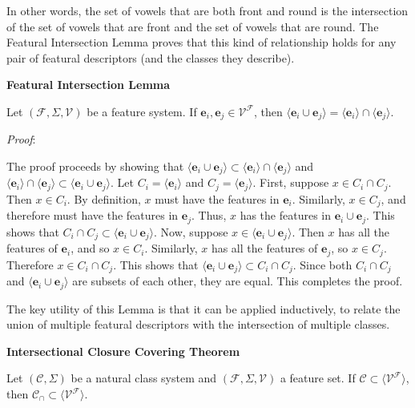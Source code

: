 \documentclass[11pt, oneside]{article}   	%
\begin{document}
In other words, the set of vowels that are both front and round is the intersection of the set of vowels that are front and the set of vowels that are round. The Featural Intersection Lemma proves that this kind of relationship holds for any pair of featural descriptors (and the classes they describe).

\vspace{\baselineskip} \noindent \textbf{Featural Intersection Lemma}

Let $(\mathcal F, \Sigma, \mathcal V)$ be a feature system. If $\mathbf{e}_i, \mathbf{e}_j \in \mathcal V^\mathcal F$, then $\langle \mathbf{e}_i \cup \mathbf{e}_j \rangle =  \langle \mathbf{e}_i \rangle \cap \langle \mathbf{e}_j \rangle$.

\vspace{\baselineskip} \noindent \textit{Proof}:

The proof proceeds by showing that $\langle \mathbf{e}_i \cup \mathbf{e}_j \rangle \subset  \langle \mathbf{e}_i \rangle \cap \langle \mathbf{e}_j \rangle$ and $ \langle \mathbf{e}_i \rangle \cap \langle \mathbf{e}_j \rangle \subset \langle \mathbf{e}_i \cup \mathbf{e}_j \rangle$.
Let $C_i = \langle \mathbf{e}_i \rangle$ and $C_j = \langle \mathbf{e}_j \rangle$.
First, suppose $x \in C_i \cap C_j$. Then $x \in C_i$. By definition, $x$ must have the features in $\mathbf{e}_i$.
Similarly, $x \in C_j$, and therefore must have the features in $\mathbf{e}_j$.
Thus, $x$ has the features in $\mathbf{e}_i \cup \mathbf{e}_j$. This shows that $C_i \cap C_j \subset \langle \mathbf{e}_i \cup \mathbf{e}_j \rangle$.
Now, suppose $x \in \langle \mathbf{e}_i \cup \mathbf{e}_j \rangle$. Then $x$ has all the features of $\mathbf{e}_i$, and so $x \in C_i$.
Similarly, $x$ has all the features of $\mathbf{e}_j$, so $x \in C_j$. Therefore $x \in C_i \cap C_j$. This shows that $\langle \mathbf{e}_i \cup \mathbf{e}_j \rangle \subset C_i \cap C_j$.
Since both $C_i \cap C_j$ and $\langle \mathbf{e}_i \cup \mathbf{e}_j \rangle$ are subsets of each other, they are equal.
This completes the proof.

\vspace{\baselineskip} \noindent The key utility of this Lemma is that it can be applied inductively, to relate the union of multiple featural descriptors with the intersection of multiple classes.

\vspace{\baselineskip} \noindent \textbf{Intersectional Closure Covering Theorem}

Let $(\mathcal C, \Sigma)$ be a natural class system and $(\mathcal F, \Sigma, \mathcal V)$ a feature set. If $\mathcal C \subset \langle \mathcal V^\mathcal F \rangle$, then $\mathcal C_\cap \subset\langle \mathcal V^\mathcal F \rangle $.
\end{document}
